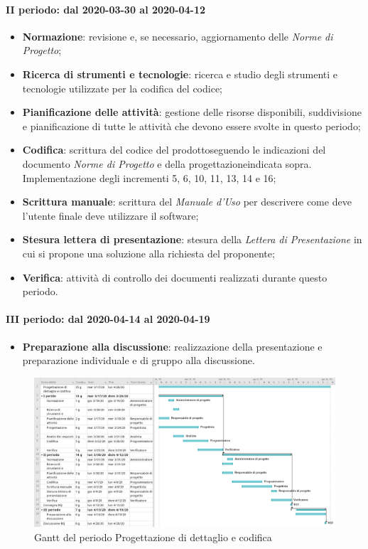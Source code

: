 \paragraph*{II periodo: dal 2020-03-30 al 2020-04-12}
\begin{itemize}
	\item \textbf{Normazione}: revisione e, se necessario, aggiornamento delle \textit{Norme di Progetto};
	\item \textbf{Ricerca di strumenti e tecnologie}: ricerca e studio degli strumenti e tecnologie utilizzate per la codifica del codice;
	\item \textbf{Pianificazione delle attività}: gestione delle risorse disponibili, suddivisione e pianificazione di tutte le attività che devono essere svolte in questo periodo;
	\item \textbf{Codifica}: scrittura del codice del prodotto\glosp seguendo le indicazioni del documento \textit{Norme di Progetto} e della progettazione\glosp indicata sopra. Implementazione degli incrementi 5, 6, 10, 11, 13, 14 e 16;
	\item \textbf{Scrittura manuale}: scrittura del \textit{Manuale d'Uso} per descrivere come deve l'utente finale deve utilizzare il software;
	\item \textbf{Stesura lettera di presentazione}: stesura della \textit{Lettera di Presentazione} in cui si propone una soluzione alla richiesta del proponente;
	\item \textbf{Verifica}: attività di controllo dei documenti realizzati durante questo periodo.
\end{itemize}

\paragraph*{III periodo: dal 2020-04-14 al 2020-04-19}
\begin{itemize}
	\item \textbf{Preparazione alla discussione}: realizzazione della presentazione e preparazione individuale e di gruppo alla discussione.
\end{itemize}

\begin{landscape}
	\begin{figure}[H] 	
		\includegraphics[width=\linewidth]{./gantt/Progettazione di dettaglio e codifica.png}	
		\caption{Gantt del periodo Progettazione di dettaglio e codifica}	
	\end{figure}
\end{landscape}

